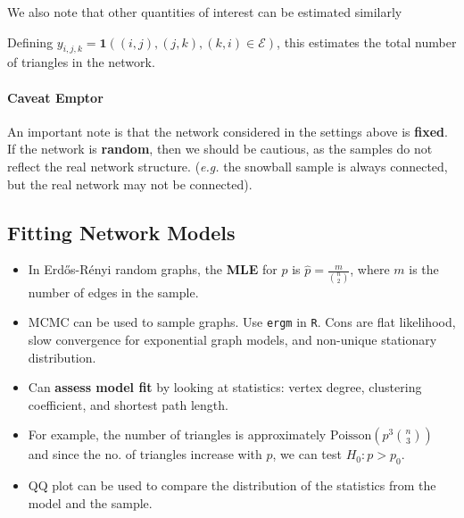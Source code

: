 \documentclass{article}
\begin{document}
We also note that other quantities of interest can be estimated similarly \begin{example}[Triangles]
    Defining $y_{i,j,k}=\mathbf{1}((i,j),(j,k),(k,i)\in \mathcal{E})$, this estimates the total number of triangles in the network.
\end{example}

\paragraph{Caveat Emptor} An important note is that the network considered in the settings above is \textbf{fixed}. If the network is \textbf{random}, then we should be cautious, as the samples do not reflect the real network structure. (\textit{e.g.} the snowball sample is always connected, but the real network may not be connected).  


\subsection{Fitting Network Models}
\begin{itemize}
    \item In Erd\H{o}s-R\'{e}nyi random graphs, the \textbf{MLE} for $p$ is $\hat{p}=\frac{m}{\binom{n}{2}}$, where $m$ is the number of edges in the sample.
    \item MCMC can be used to sample graphs. Use \verb|ergm| in \verb|R|. Cons are flat likelihood, slow convergence for exponential graph models, and non-unique stationary distribution.
    \item Can \textbf{assess model fit} by looking at statistics: vertex degree, clustering coefficient, and shortest path length.
    \item For example, the number of triangles is approximately $\mathrm{Poisson}(p^3\binom{n}{3})$ and since the no. of triangles increase with $p$, we can test $H_0: p>p_0$. 
    \item QQ plot can be used to compare the distribution of the statistics from the model and the sample.
\end{itemize}

\end{document}
